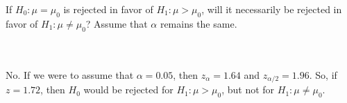 If $H_0:\mu=\mu_0$ is rejected in favor of $H_1:\mu>\mu_0$, will it necessarily be rejected in favor of
$H_1:\mu\neq\mu_0$? Assume that $\alpha$ remains the same.\\\\

\begin{solution}\renewcommand{\qedsymbol}{}\ \\
    No. If we were to assume that $\alpha=0.05$, then $z_{\alpha}=1.64$ and $z_{\alpha/2}=1.96$. So, if
    $z=1.72$, then $H_0$ would be rejected for $H_1:\mu>\mu_0$, but not for $H_1:\mu\neq\mu_0$.

\end{solution}